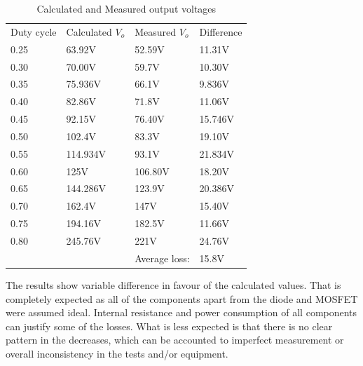 \begin{table}[H]
\begin{center}
\caption {Calculated and Measured output voltages} \label{tab:V_OUT_ALL} 
\vspace{-1mm}
\begin{tabular}{|l|l|l|l|}
\cline{1-4}
Duty cycle & Calculated $V_o$ & Measured $V_o$& Difference \\ \cline{1-4}
0.25&	63.92V & 52.59V & 11.31V \\ \cline{1-4}
0.30&	70.00V & 59.7V & 10.30V \\ \cline{1-4}
0.35&	75.936V & 66.1V & 9.836V \\ \cline{1-4}
0.40&	82.86V & 71.8V & 11.06V \\ \cline{1-4}
0.45&	92.15V & 76.40V & 15.746V \\ \cline{1-4}
0.50&	102.4V & 83.3V & 19.10V \\ \cline{1-4}
0.55&	114.934V & 93.1V & 21.834V \\ \cline{1-4}
0.60&	125V & 106.80V & 18.20V\\ \cline{1-4}
0.65&	144.286V & 123.9V & 20.386V \\ \cline{1-4}
0.70&	162.4V & 147V & 15.40V\\ \cline{1-4}
0.75&	194.16V & 182.5V & 11.66V \\ \cline{1-4}
0.80&	245.76V & 221V & 24.76V\\ \cline{1-4}
&	 & Average loss:  & 15.8V \\ \cline{1-4}
\end{tabular}
\end{center}
\end{table}

The results show variable difference in favour of the calculated values. That is completely expected as all of the components apart from the diode and MOSFET were assumed ideal. Internal resistance and power consumption of all components can justify some of the losses. What is less expected is that there is no clear pattern in the decreases, which can be accounted to imperfect measurement or overall inconsistency in the tests and/or equipment. 

